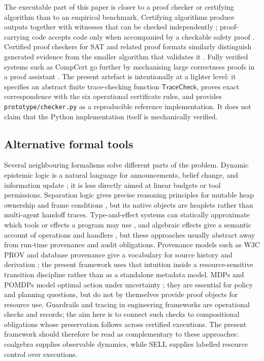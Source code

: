 \documentclass[a4paper,fleqn]{cas-sc}
\newcommand{\TraceCheck}{\mathsf{TraceCheck}}
\begin{document}
The executable part of this paper is closer to a proof checker or certifying algorithm than to an empirical benchmark. Certifying algorithms produce outputs together with witnesses that can be checked independently \cite{mcconnell2011certifying}; proof-carrying code accepts code only when accompanied by a checkable safety proof \cite{necula1997pcc}. Certified proof checkers for SAT and related proof formats similarly distinguish generated evidence from the smaller algorithm that validates it \cite{cruzfilipe2017resolution}. Fully verified systems such as CompCert go further by mechanising large correctness proofs in a proof assistant \cite{leroy2009compcert}. The present artefact is intentionally at a lighter level: it specifies an abstract finite trace-checking function \(\TraceCheck\), proves exact correspondence with the six operational certificate rules, and provides \texttt{prototype/checker.py} as a reproducible reference implementation. It does not claim that the Python implementation itself is mechanically verified.

\subsection{Alternative formal tools}

Several neighbouring formalisms solve different parts of the problem. Dynamic epistemic logic is a natural language for announcements, belief change, and information update \cite{vanditmarsch2007}; it is less directly aimed at linear budgets or tool permissions. Separation logic gives precise reasoning principles for mutable heap ownership and frame conditions \cite{reynolds2002}, but its native objects are heaplets rather than multi-agent handoff traces. Type-and-effect systems can statically approximate which tools or effects a program may use \cite{lucassen1988,nielson1999}, and algebraic effects give a semantic account of operations and handlers \cite{plotkin2003}, but these approaches usually abstract away from run-time provenance and audit obligations. Provenance models such as W3C PROV and database provenance give a vocabulary for source history and derivation \cite{moreau2013prov,buneman2001,cheney2009}; the present framework uses that intuition inside a resource-sensitive transition discipline rather than as a standalone metadata model. MDPs and POMDPs model optimal action under uncertainty \cite{puterman1994,kaelbling1998}; they are essential for policy and planning questions, but do not by themselves provide proof objects for resource use. Guardrails and tracing in engineering frameworks are operational checks and records; the aim here is to connect such checks to compositional obligations whose preservation follows across certified executions. The present framework should therefore be read as complementary to these approaches: coalgebra supplies observable dynamics, while SELL supplies labelled resource control over executions.
\end{document}
